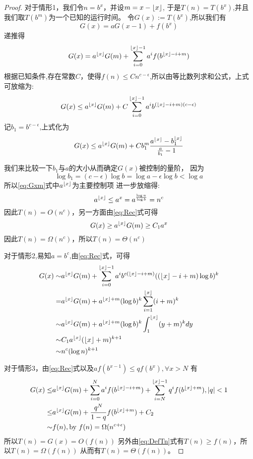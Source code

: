 \documentclass{article}
\DeclarePairedDelimiter{\floor}{\lfloor}{\rfloor}
\begin{document}
\begin{proof}

对于情形1，我们令$n=b^x$，并设$m=x-\floor{x}$,
于是$T(n)=T(b^x)$,并且我们取$T(b^m)$为一个已知的运行时间。
令$G(x):=T(b^x)$,所以我们有
\begin{equation}
G(x)=aG(x-1)+f(b^x)
\end{equation}
递推得 
\begin{equation}\label{eq:Rec}
G(x)=a^{\floor{x}}  G(m)+ \sum_{i=0}^{\floor{x}-1}a^i f(b^{\floor{x}-i+m})
\end{equation}
根据已知条件,存在常数$C$，使得$f(n)\leq C n^{c-\epsilon}$,所以由等比数列求和公式，上式
可放缩为:
\begin{equation}\label{eq:Gxm}
G(x)\leq a^{\floor{x}}  G(m)+ C \sum_{i=0}^{\floor{x}-1}a^i b^{(\floor{x}-i+m)(c-\epsilon)} 
\end{equation}
记$b_1=b^{c-\epsilon}$,上式化为
\begin{equation}
G(x)\leq a^{\floor{x}}  G(m)+C b_1^m \frac{a^{\floor{x}}-b_1^{\floor{x}}}{\frac{a}{b_1}-1}
\end{equation}

我们来比较一下$b_1$与$a$的大小从而确定$G(x)$被控制的量阶，
因为
\begin{equation}
\log b_1 = (c-\epsilon)\log b =\log a - \epsilon \log b < \log a
\end{equation}
所以\eqref{eq:Gxm}式中$a^{\floor{x}}$为主要控制项
进一步放缩得:
\begin{equation}
a^{\floor{x}} \leq a^x = a^{\frac{\log n}{\log b} }= n^c
\end{equation}
因此$T(n)=O(n^c)$，另一方面由\eqref{eq:Rec}式可得
\begin{equation}
G(x)\geq a^{\floor{x}}  G(m) \geq C_1 a^x
\end{equation}
因此$T(n)=\Omega(n^c)$，所以$T(n)=\Theta(n^c)$

对于情形2,易知$a=b^c$,由\eqref{eq:Rec}式，可得
\begin{align*}
G(x) \sim & a^{\floor{x}}  G(m)+ \sum_{i=0}^{\floor{x}-1} a^i b^{c(\floor{x}-i+m)} ((\floor{x}-i+m)\log b)^k\\
= &  a^{\floor{x}}  G(m) + a^{\floor{x}+m} (\log b)^k\sum_{i=1}^{\floor{x}}(i+m)^k  \\
\sim & a^{\floor{x}}  G(m) + a^{\floor{x}+m} (\log b)^k\int_{1}^{\floor{x}}(y+m)^kdy \\
\sim & C_1 a^{\floor{x}}(\floor{x}+m)^{k+1} \\
\sim & n^c (\log n)^{k+1}
\end{align*}

对于情形3，由\eqref{eq:Rec}式以及$af(b^{x-1})\leq qf(b^x),\forall x>N$
有
\begin{align*}
G(x) \leq & a^{\floor{x}}  G(m)+ \sum_{i=0}^{N} a^i f(b^{\floor{x}-i+m})+ \sum_{i=N}^{\floor{x}-1}q^i f(b^{\floor{x}+m}), |q|<1\\
\leq  & a^{\floor{x}}  G(m)+ \frac{q^N}{1-q}f(b^{\floor{x}+m})+C_2\\
\sim & f(n),\text{by }f(n)=\Omega(n^{c+\epsilon})
\end{align*}
所以$T(n)=G(x)=O(f(n))$
另外由\eqref{eq:DefTn}式有$T(n)\geq f(n)$，所以$T(n)=\Omega(f(n))$
从而有$T(n)=\Theta(f(n))$。
\end{proof}
\end{document}

